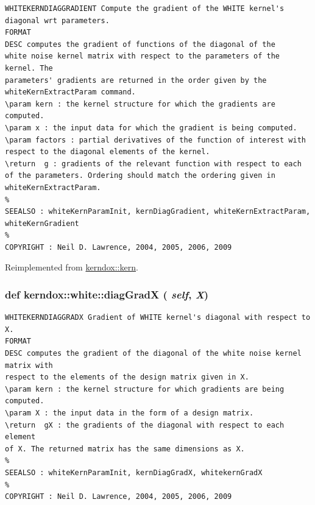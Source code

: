 \footnotesize\begin{verbatim}WHITEKERNDIAGGRADIENT Compute the gradient of the WHITE kernel's diagonal wrt parameters.
FORMAT
DESC computes the gradient of functions of the diagonal of the
white noise kernel matrix with respect to the parameters of the kernel. The
parameters' gradients are returned in the order given by the
whiteKernExtractParam command.
\param kern : the kernel structure for which the gradients are
computed.
\param x : the input data for which the gradient is being computed.
\param factors : partial derivatives of the function of interest with
respect to the diagonal elements of the kernel.
\return  g : gradients of the relevant function with respect to each
of the parameters. Ordering should match the ordering given in
whiteKernExtractParam.
%
SEEALSO : whiteKernParamInit, kernDiagGradient, whiteKernExtractParam, whiteKernGradient
%
COPYRIGHT : Neil D. Lawrence, 2004, 2005, 2006, 2009

\end{verbatim}
\normalsize
 

Reimplemented from \hyperlink{classkerndox_1_1kern}{kerndox::kern}.\hypertarget{classkerndox_1_1white_b0eee0d7ea27e278d7d39952053db3fc}{
\subsubsection[{diagGradX}]{\setlength{\rightskip}{0pt plus 5cm}def kerndox::white::diagGradX ( {\em self}, \/   {\em X})}}
\label{classkerndox_1_1white_b0eee0d7ea27e278d7d39952053db3fc}




\footnotesize\begin{verbatim}WHITEKERNDIAGGRADX Gradient of WHITE kernel's diagonal with respect to X.
FORMAT
DESC computes the gradient of the diagonal of the white noise kernel matrix with
respect to the elements of the design matrix given in X.
\param kern : the kernel structure for which gradients are being computed.
\param X : the input data in the form of a design matrix.
\return  gX : the gradients of the diagonal with respect to each element
of X. The returned matrix has the same dimensions as X.
%
SEEALSO : whiteKernParamInit, kernDiagGradX, whitekernGradX
%
COPYRIGHT : Neil D. Lawrence, 2004, 2005, 2006, 2009

\end{verbatim}
\normalsize
 

